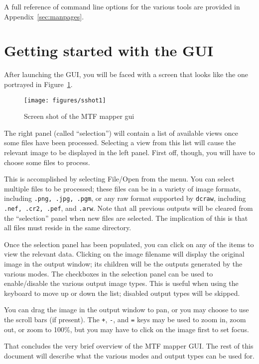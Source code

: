 \documentclass[a4paper]{article}
\begin{document}
A full reference of command line options for the various tools are provided
in Appendix~\ref{sec:manpages}.

\section{Getting started with the GUI}
After launching the GUI, you will be faced with a screen that looks like the
one portrayed in Figure~\ref{fig:sshot1}.

\begin{figure}[ht!]
\centering
\texttt{[image: figures/sshot1]}
\caption{Screen shot of the MTF mapper gui}
\label{fig:sshot1}
\end{figure}

The right panel (called ``selection'') will contain a list of available
views once some files have been processed. Selecting a view from this list
will cause the relevant image to be displayed in the left panel. First off,
though, you will have to choose some files to process.

This is accomplished by selecting File/Open from the menu. You can select
multiple files to be processed; these files can be in a variety of image formats,
including \texttt{.png, .jpg, .pgm}, or any raw format supported by \verb+dcraw+,
including \texttt{.nef, .cr2, .pef}, and \texttt{.arw}. Note that all
previous outputs will be cleared from the ``selection'' panel when new files are 
selected. The implication of this is that all files must reside in the same
directory.

Once the selection panel has been populated, you can click on any of the
items to view the relevant data. Clicking on the image filename will display
the original image in the output window; its children will be the outputs
generated by the various modes. The checkboxes in the selection panel can be
used to enable/disable the various output image types. This is useful when
using the keyboard to move up or down the list; disabled output types will
be skipped. 

You can drag the image in the output window to pan, or you may choose to use
the scroll bars (if present). The \verb-+-, \verb+-+, and \verb+=+ keys may
be used to zoom in, zoom out, or zoom to 100\%, but you may have to click on
the image first to set focus.

That concludes the very brief overview of the MTF mapper GUI. The rest of
this document will describe what the various modes and output types can be
used for.
\end{document}
